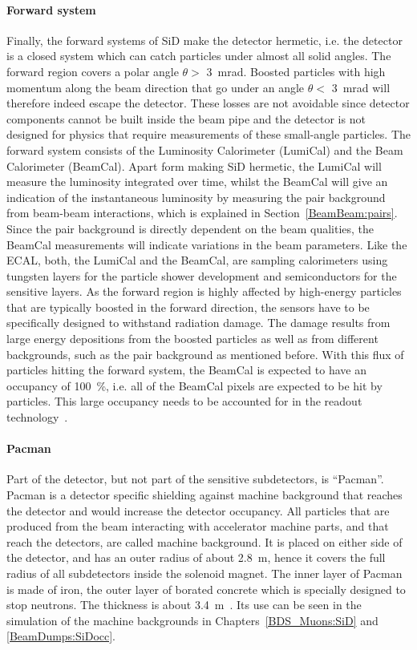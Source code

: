\paragraph{Forward system}
Finally, the forward systems of SiD make the detector hermetic, i.e. the detector is a closed system which can catch particles under almost all solid angles.
The forward region covers a polar angle $\theta > $ \SI{3}{\milli\radian}.
Boosted particles with high momentum along the beam direction that go under an angle $\theta < $ \SI{3}{\milli\radian} will therefore indeed escape the detector.
These losses are not avoidable since detector components cannot be built inside the beam pipe and the detector is not designed for physics that require measurements of these small-angle particles.
The forward system consists of the Luminosity Calorimeter (LumiCal) and the Beam Calorimeter (BeamCal).
Apart form making SiD hermetic, the LumiCal will measure the luminosity integrated over time, whilst the BeamCal will give an indication of the instantaneous luminosity by measuring the \positron \electron pair background from beam-beam interactions, which is explained in Section~\ref{BeamBeam:pairs}.
Since the pair background is directly dependent on the beam qualities, the BeamCal measurements will indicate variations in the beam parameters.
Like the ECAL, both, the LumiCal and the BeamCal, are sampling calorimeters using tungsten layers for the particle shower development and semiconductors for the sensitive layers.
As the forward region is highly affected by high-energy particles that are typically boosted in the forward direction, the sensors have to be specifically designed to withstand radiation damage.
The damage results from large energy depositions from the boosted particles as well as from different backgrounds, such as the pair background as mentioned before.
With this flux of particles hitting the forward system, the BeamCal is expected to have an occupancy of \SI{100}{\percent}, i.e. all of the BeamCal pixels are expected to be hit by particles.
This large occupancy needs to be accounted for in the readout technology~\cite[p. 133ff]{TDR4}.
\paragraph{Pacman}
Part of the detector, but not part of the sensitive subdetectors, is ``Pacman''.
Pacman is a detector specific shielding against machine background that reaches the detector and would increase the detector occupancy.
All particles that are produced from the beam interacting with accelerator machine parts, and that reach the detectors, are called machine background.
It is placed on either side of the detector, and has an outer radius of about \SI{2.8}{\meter}, hence it covers the full radius of all subdetectors inside the solenoid magnet.
The inner layer of Pacman is made of iron, the outer layer of borated concrete which is specially designed to stop neutrons.
The thickness is about \SI{3.4}{\meter}~\cite{SiD_Geo}.
Its use can be seen in the simulation of the machine backgrounds in Chapters~\ref{BDS_Muons:SiD} and \ref{BeamDumps:SiDocc}.

